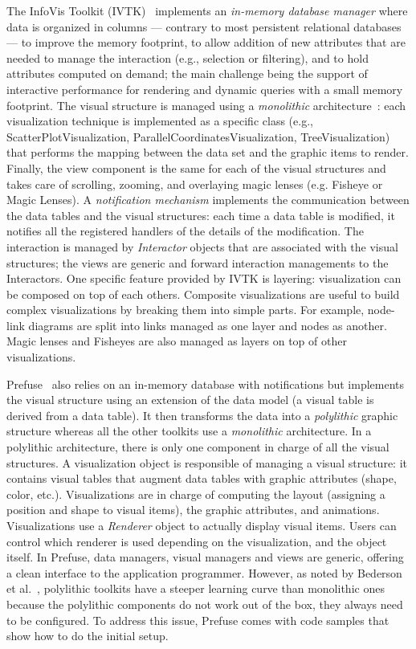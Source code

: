 The InfoVis Toolkit (IVTK)~\cite{InfoVis} implements an
\emph{in-memory database manager} where data is organized in columns
--- contrary to most persistent relational databases --- to improve
the memory footprint, to allow addition of new attributes that are
needed to manage the interaction (e.g., selection or filtering), and to
hold attributes computed on demand; the main challenge being the
support of interactive performance for rendering and dynamic queries
with a small memory footprint.  The visual structure is managed using
a \emph{monolithic} architecture~\cite{Polylithic}: each visualization
technique is implemented as a specific class
(e.g., ScatterPlotVisualization, ParallelCoordinatesVisualization,
TreeVisualization) that performs the mapping between the data set and
the graphic items to render.  Finally, the view component is the same
for each of the visual structures and takes care of scrolling,
zooming, and overlaying magic lenses (e.g. Fisheye or Magic Lenses).  A
\emph{notification mechanism} implements the communication between the
data tables and the visual structures: each time a data table is
modified, it notifies all the registered handlers of the details of
the modification. The interaction is managed by \emph{Interactor}
objects that are associated with the visual structures; the views are
generic and forward interaction managements to the Interactors.  One
specific feature provided by IVTK is layering: visualization can be
composed on top of each others.  Composite visualizations are useful
to build complex visualizations by breaking them into simple parts. For
example, node-link diagrams are split into links managed as one layer
and nodes as another.  Magic lenses and Fisheyes are also managed as
layers on top of other visualizations.

Prefuse~\cite{Prefuse} also relies on an in-memory database with
notifications but implements the visual structure using an extension of
the data model (a visual table is derived from a data table).  It then
transforms the data into a \emph{polylithic} graphic structure whereas
all the other toolkits use a \emph{monolithic} architecture.  In a
polylithic architecture, there is only one component in charge of all
the visual structures.  A visualization object is responsible of
managing a visual structure: it contains visual tables that augment
data tables with graphic attributes (shape, color, etc.).
Visualizations are in charge of computing the layout (assigning a
position and shape to visual items), the graphic attributes, and
animations.  Visualizations use a \emph{Renderer} object to actually
display visual items.  Users can control which renderer is used
depending on the visualization, and the object itself.  In Prefuse,
data managers, visual managers and views are generic, offering a
clean interface to the application programmer.  However, as noted by
Bederson et al.~\cite{Polylithic}, polylithic toolkits have a steeper
learning curve than monolithic ones because the polylithic components
do not work out of the box, they always need to be configured.  To
address this issue, Prefuse comes with code samples that show how to
do the initial setup.

